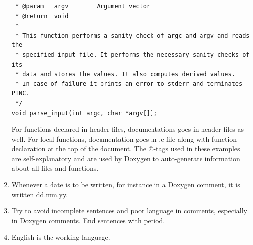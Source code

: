 \documentclass[10pt,a4paper]{article}
\begin{document}
\begin{enumerate}
\begin{lstlisting}
 * @param	argv		Argument vector
 * @return	void 
 *
 * This function performs a sanity check of argc and argv and reads the
 * specified input file. It performs the necessary sanity checks of its
 * data and stores the values. It also computes derived values.
 * In case of failure it prints an error to stderr and terminates PINC.
 */
void parse_input(int argc, char *argv[]);
	\end{lstlisting}
	For functions declared in header-files, documentations goes in header files as well. For local functions, documentation goes in .c-file along with function declaration at the top of the document. The @-tags used in these examples are self-explanatory and are used by Doxygen to auto-generate information about all files and functions.
	\item Whenever a date is to be written, for instance in a Doxygen comment, it is written dd.mm.yy.
	\item Try to avoid incomplete sentences and poor language in comments, especially in Doxygen comments. End sentences with period.
	\item English is the working language.
\end{enumerate}
\end{document}
